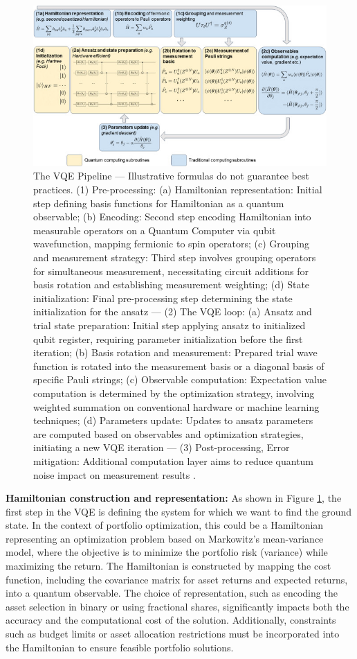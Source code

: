 \documentclass[%
 reprint,
 amsmath,amssymb,
 aps,
]{revtex4-2}
\begin{document}
\begin{figure}
\includegraphics[width=16cm]{Pictures/VQE Algorithm.jpg}
\caption{\label{fig:pipeline} The VQE Pipeline — Illustrative formulas do not guarantee best practices. (1) Pre-processing: (a) Hamiltonian representation: Initial step defining basis functions for Hamiltonian as a quantum observable; (b) Encoding: Second step encoding Hamiltonian into measurable operators on a Quantum Computer via qubit wavefunction, mapping fermionic to spin operators; (c) Grouping and measurement strategy: Third step involves grouping operators for simultaneous measurement, necessitating circuit additions for basis rotation and establishing measurement weighting; (d) State initialization: Final pre-processing step determining the state initialization for the ansatz — (2) The VQE loop: (a) Ansatz and trial state preparation: Initial step applying ansatz to initialized qubit register, requiring parameter initialization before the first iteration; (b) Basis rotation and measurement: Prepared trial wave function is rotated into the measurement basis or a diagonal basis of specific Pauli strings; (c) Observable computation: Expectation value computation is determined by the optimization strategy, involving weighted summation on conventional hardware or machine learning techniques; (d) Parameters update: Updates to ansatz parameters are computed based on observables and optimization strategies, initiating a new VQE iteration — (3) Post-processing, Error mitigation: Additional computation layer aims to reduce quantum noise impact on measurement results \cite{Tilly2022}.}
\end{figure}

\textbf{Hamiltonian construction and representation:} As shown in Figure \ref{fig:pipeline}, the first step in the VQE is defining the system for which we want to find the ground state. In the context of portfolio optimization, this could be a Hamiltonian representing an optimization problem based on Markowitz's mean-variance model, where the objective is to minimize the portfolio risk (variance) while maximizing the return. The Hamiltonian is constructed by mapping the cost function, including the covariance matrix for asset returns and expected returns, into a quantum observable. The choice of representation, such as encoding the asset selection in binary or using fractional shares, significantly impacts both the accuracy and the computational cost of the solution. Additionally, constraints such as budget limits or asset allocation restrictions must be incorporated into the Hamiltonian to ensure feasible portfolio solutions.
\end{document}
